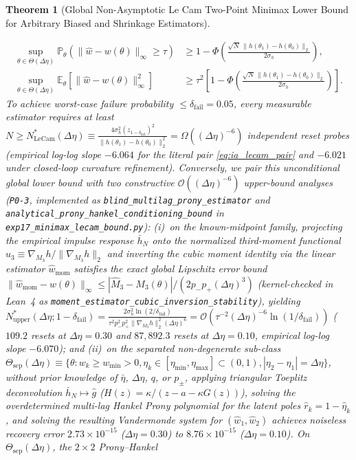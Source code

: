 \documentclass[12pt]{article}
\newtheorem{theorem}{Theorem}[section]
\theoremstyle{definition}
\theoremstyle{remark}
\begin{document}
\begin{theorem}[Global Non-Asymptotic Le Cam Two-Point Minimax Lower Bound for Arbitrary Biased and Shrinkage Estimators]
\begin{enumerate}
\begin{equation}
\begin{aligned}
\sup_{\theta \in \Theta(\Delta\eta)} \mathbb{P}_\theta\!\left( \|\hat{w} - w(\theta)\|_\infty \ge \tau \right) &\ge 1 - \Phi\!\left( \frac{\sqrt{N}\, \|h(\theta_1) - h(\theta_0)\|_2}{2 \sigma_h} \right), \\
\sup_{\theta \in \Theta(\Delta\eta)} \mathbb{E}_\theta\!\left[ \|\hat{w} - w(\theta)\|_\infty^2 \right] &\ge \tau^2 \left[ 1 - \Phi\!\left( \frac{\sqrt{N}\, \|h(\theta_1) - h(\theta_0)\|_2}{2 \sigma_h} \right) \right].
\end{aligned}
\end{equation}
To achieve worst-case failure probability $\le \delta_{\mathrm{fail}} = 0.05$, every measurable estimator requires at least $N \ge N^*_{\mathrm{LeCam}}(\Delta\eta) \equiv \frac{4\sigma_h^2 (z_{1-\delta_{\mathrm{fail}}})^2}{\|h(\theta_1) - h(\theta_0)\|_2^2} = \Omega((\Delta\eta)^{-6})$ independent reset probes (empirical log-log slope $-6.064$ for the literal pair \eqref{eq:ia_lecam_pair} and $-6.021$ under closed-loop curvature refinement). Conversely, we pair this unconditional global lower bound with two constructive $\mathcal{O}((\Delta\eta)^{-6})$ upper-bound analyses (\texttt{P0-3}, implemented as \nolinkurl{blind_multilag_prony_estimator} and \nolinkurl{analytical_prony_hankel_conditioning_bound} in \nolinkurl{exp17_minimax_lecam_bound.py}): (i)~on the known-midpoint family, projecting the empirical impulse response $\bar{h}_N$ onto the normalized third-moment functional $u_3 \equiv \nabla_{M_3} h / \|\nabla_{M_3} h\|_2$ and inverting the cubic moment identity via the linear estimator $\hat{w}_{\mathrm{mom}}$ satisfies the exact global Lipschitz error bound $\|\hat{w}_{\mathrm{mom}} - w(\theta)\|_\infty \le |\hat{M}_3 - M_3(\theta)| / (2 p_- p_+ (\Delta\eta)^3)$ (kernel-checked in Lean~4 as \nolinkurl{moment_estimator_cubic_inversion_stability}), yielding $N^*_{\mathrm{upper}}(\Delta\eta; 1-\delta_{\mathrm{fail}}) = \frac{2\sigma_h^2 \ln(2/\delta_{\mathrm{fail}})}{\tau^2 p_-^2 p_+^2 \|\nabla_{M_3} h\|_2^2 (\Delta\eta)^6} = \mathcal{O}(\tau^{-2}(\Delta\eta)^{-6}\ln(1/\delta_{\mathrm{fail}}))$ ($109.2$ resets at $\Delta\eta = 0.30$ and $87{,}892.3$ resets at $\Delta\eta = 0.10$, empirical log-log slope $-6.070$); and (ii)~on the separated non-degenerate sub-class $\Theta_{\mathrm{sep}}(\Delta\eta) \equiv \{\theta : w_k \ge w_{\min} > 0, \eta_k \in [\eta_{\min}, \eta_{\max}] \subset (0, 1), |\eta_2 - \eta_1| = \Delta\eta\}$, without prior knowledge of $\bar{\eta}$, $\Delta\eta$, $q$, or $p_\pm$, applying triangular Toeplitz deconvolution $\bar{h}_N \mapsto \hat{g}$ ($H(z) = \kappa / (z - a - \kappa G(z))$), solving the overdetermined multi-lag Hankel Prony polynomial for the latent poles $\hat{r}_k = 1 - \hat{\eta}_k$, and solving the resulting Vandermonde system for $(\hat{w}_1, \hat{w}_2)$ achieves noiseless recovery error $2.73 \times 10^{-15}$ ($\Delta\eta = 0.30$) to $8.76 \times 10^{-15}$ ($\Delta\eta = 0.10$). On $\Theta_{\mathrm{sep}}(\Delta\eta)$, the $2 \times 2$ Prony--Hankel 
\end{enumerate}
\end{theorem}
\end{document}
